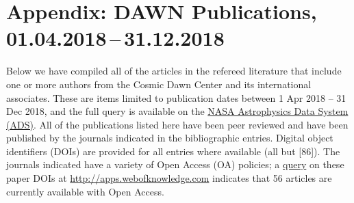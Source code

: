 \documentclass{article}
\begin{document}
\newcommand\grl{\ref@jnl{Geophys.~Res.~Lett.}}%
\newcommand\jcp{\ref@jnl{JChPh}}%
\newcommand\jgr{\ref@jnl{J.~Geophys.~Res.}}%
\newcommand\jqsrt{\ref@jnl{JQSRT}}%
\newcommand\memsai{\ref@jnl{MmSAI}}%
\newcommand\nphysa{\ref@jnl{NuPhA}}%
\newcommand\physrep{\ref@jnl{PhR}}%
\newcommand\physscr{\ref@jnl{PhyS}}%
\newcommand\planss{\ref@jnl{Planet.~Space~Sci.}}%
\newcommand\procspie{\ref@jnl{Proc.~SPIE}}%

\newcommand\actaa{\ref@jnl{AcA}}%
\newcommand\caa{\ref@jnl{ChA\&A}}%
\newcommand\cjaa{\ref@jnl{ChJA\&A}}%
\newcommand\jcap{\ref@jnl{JCAP}}%
\newcommand\na{\ref@jnl{NewA}}%
\newcommand\nar{\ref@jnl{NewAR}}%
\newcommand\pasa{\ref@jnl{PASA}}%
\newcommand\rmxaa{\ref@jnl{RMxAA}}%

\newcommand\maps{\ref@jnl{M\&PS}}%
\newcommand\aas{\ref@jnl{AAS Meeting Abstracts}}%
\newcommand\dps{\ref@jnl{AAS/DPS Meeting Abstracts}}%

\newcommand\textrightarrow{$\rightarrow$}

\nocite{*}

\section*{Appendix: DAWN Publications, 01.04.2018\,--\,31.12.2018}

Below we have compiled all of the articles in the refereed literature that include one or more authors from the Cosmic Dawn Center and its international associates.  These are items limited to publication dates between 1 Apr 2018 -- 31 Dec 2018, and the full query is available on the \href{https://xxx}{NASA Astrophysics Data System (ADS)}.  All of the publications listed here have been peer reviewed and have been published by the journals indicated in the bibliographic entries.  Digital object identifiers (DOIs) are provided for all entries where available (all but [86]).  The journals indicated have a variety of Open Access (OA) policies; a \href{http://apps.webofknowledge.com/summary.do?product=WOS&doc=1&qid=12&SID=C2qOr5M76UWlqObDwDV}{query} on these paper DOIs at \href{http://apps.webofknowledge.com}{http://apps.webofknowledge.com} indicates that 56 articles are currently available with Open Access.  
\end{document}

